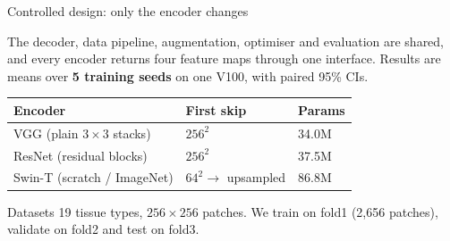 \documentclass[final]{beamer}
\newlength{\colwidth}
\begin{document}
\begin{frame}[t]
\begin{columns}[t]
\begin{column}{\colwidth}
  \begin{block}{Controlled design: only the encoder changes}
    \begin{center}
    \end{center}
    The decoder, data pipeline, augmentation, optimiser and evaluation are shared, and
    every encoder returns four feature maps through one interface. Results are means over
    \textbf{5 training seeds} on one V100, with paired 95\% CIs.

    \medskip
    \begin{center}
    \begin{tabular}{@{}lll@{}}
      \toprule
      \textbf{Encoder} & \textbf{First skip} & \textbf{Params} \\
      \midrule
      VGG (plain $3\times3$ stacks) & $256^2$ & 34.0M \\
      ResNet (residual blocks)      & $256^2$ & 37.5M \\
      Swin-T (scratch / ImageNet)   & $64^2 \to$ upsampled & 86.8M \\
      \bottomrule
    \end{tabular}
    \end{center}
  \end{block}

  \begin{block}{Datasets}
    19 tissue types, $256\times256$ patches. We train on fold1 (2,656 patches),
    validate on fold2 and test on fold3.


\end{block}
\end{column}
\end{columns}
\end{frame}
\end{document}
